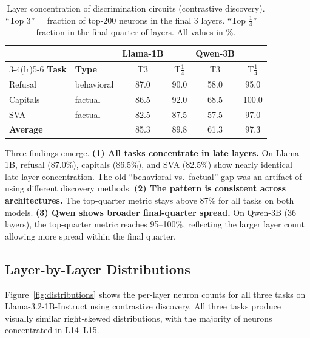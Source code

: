 \documentclass{article}
\begin{document}
\begin{table}[t]
\caption{Layer concentration of discrimination circuits (contrastive discovery). ``Top 3'' = fraction of top-200 neurons in the final 3 layers. ``Top $\frac{1}{4}$'' = fraction in the final quarter of layers. All values in \%.}
\label{tab:localization}
\vskip 0.1in
\begin{center}
\begin{tabular}{llcccc}
\toprule
& & \textbf{Llama-1B} & & \textbf{Qwen-3B} & \\
\cmidrule(lr){3-4}\cmidrule(lr){5-6}
\textbf{Task} & \textbf{Type} & T3 & T$\frac{1}{4}$ & T3 & T$\frac{1}{4}$ \\
\midrule
Refusal   & behavioral & 87.0 & 90.0 & 58.0 & 95.0 \\
Capitals  & factual    & 86.5 & 92.0 & 68.5 & 100.0 \\
SVA       & factual    & 82.5 & 87.5 & 57.5 & 97.0 \\
\midrule
\textbf{Average} &  & 85.3 & 89.8 & 61.3 & 97.3 \\
\bottomrule
\end{tabular}
\end{center}
\end{table}

Three findings emerge. \textbf{(1) All tasks concentrate in late layers.} On Llama-1B, refusal (87.0\%), capitals (86.5\%), and SVA (82.5\%) show nearly identical late-layer concentration.
The old ``behavioral vs.\ factual'' gap was an artifact of using different discovery methods.
\textbf{(2) The pattern is consistent across architectures.} The top-quarter metric stays above 87\% for all tasks on both models.
\textbf{(3) Qwen shows broader final-quarter spread.} On Qwen-3B (36 layers), the top-quarter metric reaches 95--100\%, reflecting the larger layer count allowing more spread within the final quarter.

\subsection{Layer-by-Layer Distributions}

Figure~\ref{fig:distributions} shows the per-layer neuron counts for all three tasks on Llama-3.2-1B-Instruct using contrastive discovery.
All three tasks produce visually similar right-skewed distributions, with the majority of neurons concentrated in L14--L15.
\end{document}

